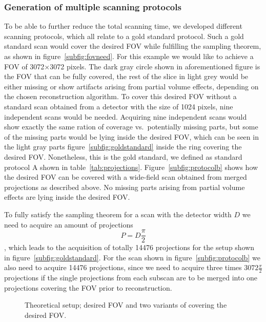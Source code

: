 \subsubsection{Generation of multiple scanning protocols}
To be able to further reduce the total scanning time, we developed different scanning protocols, which all relate to a gold standard protocol. Such a gold standard scan would cover the desired FOV while fulfilling the sampling theorem, as shown in figure~\ref{subfig:fovneed}. For this example we would like to achieve a FOV of 3072$\times$3072 pixels. The dark gray circle shown in aforementioned figure is the FOV that can be fully covered, the rest of the slice in light grey would be either missing or show artifacts arising from partial volume effects, depending on the chosen reconstruction algorithm. To cover this desired FOV without a standard scan obtained from a detector with the size of 1024 pixels, nine independent scans would be needed. Acquiring nine independent scans would show exactly the same ration of coverage vs.\ potentially missing parts, but some of the missing parts would be lying inside the desired FOV, which can be seen in the light gray parts figure~\ref{subfig:goldstandard} inside the ring covering the desired FOV. Nonetheless, this is the gold standard, we defined as standard protocol A shown in table~\ref{tab:projections}. Figure~\ref{subfig:protocolb} shows how the desired FOV can be covered with a wide-field scan obtained from merged projections as described above. No missing parts arising from partial volume effects are lying inside the desired FOV.

To fully satisfy the sampling theorem for a scan with the detector width $D$ we need to acquire an amount of projections \[P=D\frac{\pi}{2}\], which leads to the acquisition of totally 14476 projections for the setup shown in figure~\ref{subfig:goldstandard}. For the scan shown in figure~\ref{subfig:protocolb} we also need to acquire 14476 projections, since we need to acquire three times \(3072\frac{\pi}{2}\) projections if the single projections from each subscan are to be merged into one projections covering the FOV prior to reconstruction.
\cbend

\cbstart
\begin{figure}[htp]
	\centering
	
	\caption{Theoretical setup; desired FOV and two variants of covering the desired FOV.}
	\label{fig:goldstandard}
\end{figure}
\cbend

